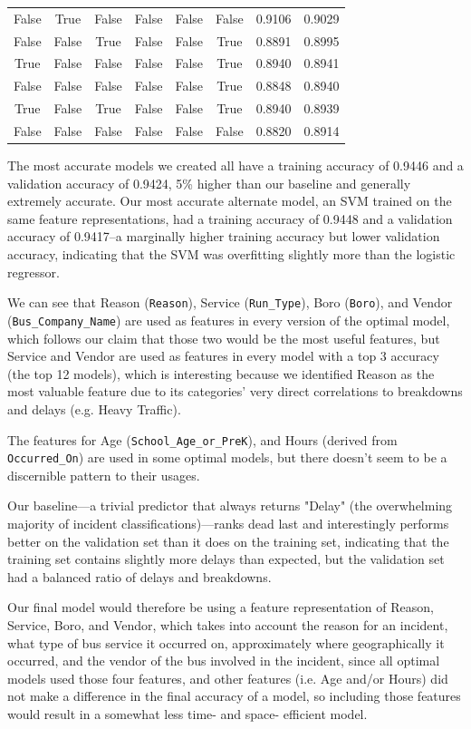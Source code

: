 \documentclass[11pt]{article}
\begin{document}
\begin{table}[h]
\begin{tabular}{cccccc|cc}
False & True & False & False & False & False & 0.9106 & 0.9029 \\
False & False & True & False & False & True & 0.8891 & 0.8995 \\
True & False & False & False & False & True & 0.8940 & 0.8941 \\
False & False & False & False & False & True & 0.8848 & 0.8940 \\
True & False & True & False & False & True & 0.8940 & 0.8939 \\
False & False & False & False & False & False & 0.8820 & 0.8914 \\
\end{tabular}
\end{table}

The most accurate models we created all have a training accuracy of 0.9446 and a validation accuracy of 0.9424, 5\% higher than our baseline and generally extremely accurate. Our most accurate alternate model, an SVM trained on the same feature representations, had a training accuracy of 0.9448 and a validation accuracy of 0.9417--a marginally higher training accuracy but lower validation accuracy, indicating that the SVM was overfitting slightly more than the logistic regressor.

We can see that Reason (\texttt{Reason}), Service (\texttt{Run\_Type}), Boro (\texttt{Boro}), and Vendor (\texttt{Bus\_Company\_Name}) are used as features in every version of the optimal model, which follows our claim that those two would be the most useful features, but Service and Vendor are used as features in every model with a top 3 accuracy (the top 12 models), which is interesting because we identified Reason as the most valuable feature due to its categories' very direct correlations to breakdowns and delays (e.g. Heavy Traffic).

The features for Age (\texttt{School\_Age\_or\_PreK}), and Hours (derived from \texttt{Occurred\_On}) are used in some optimal models, but there doesn't seem to be a discernible pattern to their usages.

Our baseline---a trivial predictor that always returns "Delay" (the overwhelming majority of incident classifications)---ranks dead last and interestingly performs better on the validation set than it does on the training set, indicating that the training set contains slightly more delays than expected, but the validation set had a balanced ratio of delays and breakdowns.

Our final model would therefore be using a feature representation of Reason, Service, Boro, and Vendor, which takes into account the reason for an incident, what type of bus service it occurred on, approximately where geographically it occurred, and the vendor of the bus involved in the incident, since all optimal models used those four features, and other features (i.e. Age and/or Hours) did not make a difference in the final accuracy of a model, so including those features would result in a somewhat less time- and space- efficient model.
\end{document}
